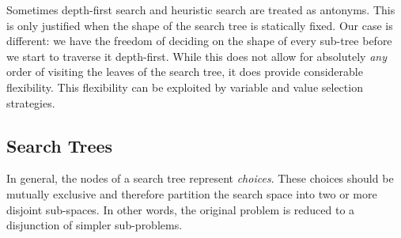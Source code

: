 Sometimes depth-first search and heuristic search are treated as antonyms.
This is only justified when the shape of the search tree is statically fixed.
Our case is different: we have the freedom of deciding on the shape of every
sub-tree before we start to traverse it depth-first. While this does not
allow for absolutely {\em any} order of visiting the leaves of the search tree,
it does provide considerable flexibility. This flexibility can be exploited
by variable and value selection strategies.

\subsection{Search Trees}

In general, the nodes of a search tree represent {\em choices}.
These choices should be mutually exclusive and therefore partition the
search space into two or more disjoint sub-spaces.
In other words, the original problem is reduced to a disjunction
of simpler sub-problems.

